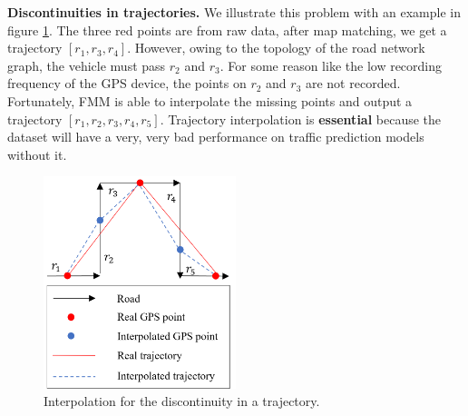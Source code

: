 \vspace{\baselineskip}

\textbf{Discontinuities in trajectories.} We illustrate this problem with an example in figure \ref{fig: traj_interpolate}. The three red points are from raw data, after map matching, we get a trajectory $[r_1, r_3, r_4]$. However, owing to the topology of the road network graph, the vehicle must pass $r_2$ and $r_3$. For some reason like the low recording frequency of the GPS device, the points on $r_2$ and $r_3$ are not recorded. Fortunately, FMM is able to interpolate the missing points and output a trajectory $[r_1, r_2, r_3, r_4, r_5]$. Trajectory interpolation is \textbf{essential} because the dataset will have a very, very bad performance on traffic prediction models without it.

\begin{figure}[htb]
  \centering
  \includegraphics[width=0.5\textwidth]{images/traj_interpolate.png}
  \caption{Interpolation for the discontinuity in a trajectory.}
  \label{fig: traj_interpolate}
\end{figure}
